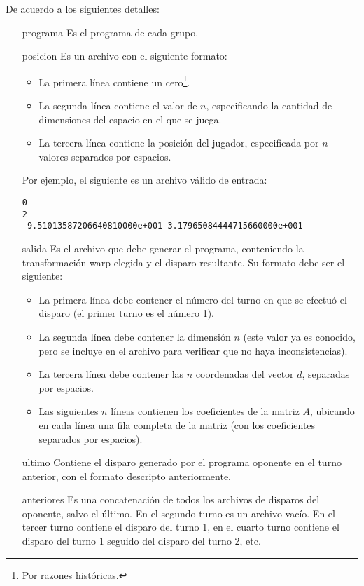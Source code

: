 De acuerdo a los siguientes detalles:
\begin{enumerate}
 \item[programa] Es el programa de cada grupo.
 \item[posicion] Es un archivo con el siguiente formato:
\begin{itemize}
    \item La primera l\'inea contiene un cero\footnote{Por razones hist\'oricas.}.
    \item La segunda l\'inea contiene el valor de $n$, especificando la cantidad de dimensiones del
    espacio en el que se juega.
    \item La tercera l\'inea contiene la posici\'on del jugador, especificada por $n$ valores separados
    por espacios.
\end{itemize}
Por ejemplo, el siguiente es un archivo v\'alido de entrada:
\begin{verbatim}
0
2
-9.51013587206640810000e+001 3.17965084444715660000e+001
\end{verbatim}
\item[salida] Es el archivo que debe generar el programa, conteniendo la transformaci\'on warp elegida y el disparo resultante. Su formato debe ser el siguiente:
\begin{itemize}
    \item La primera l\'inea debe contener el n\'umero del turno en que se efectu\'o el disparo 
    (el primer turno es el n\'umero 1).
    \item La segunda l\'inea debe contener la dimensi\'on $n$ (este valor ya es conocido, pero se incluye
    en el archivo para verificar que no haya inconsistencias).
    \item La tercera l\'inea debe contener las $n$ coordenadas del vector $d$, separadas por espacios.
    \item Las siguientes $n$ l\'ineas contienen los coeficientes de la matriz $A$, ubicando en cada
    l\'inea una fila completa de la matriz (con los coeficientes separados por espacios).
\end{itemize}
\item[ultimo] Contiene el disparo generado por el programa oponente en el turno anterior, con el formato descripto anteriormente.
\item[anteriores] Es una concatenaci\'on de todos los archivos de disparos del oponente, salvo el \'ultimo. En el segundo turno es un archivo vac\'io. En el tercer turno contiene el disparo del turno 1, en el cuarto turno contiene el disparo del turno 1 seguido del disparo del turno 2, etc.
\end{enumerate}




